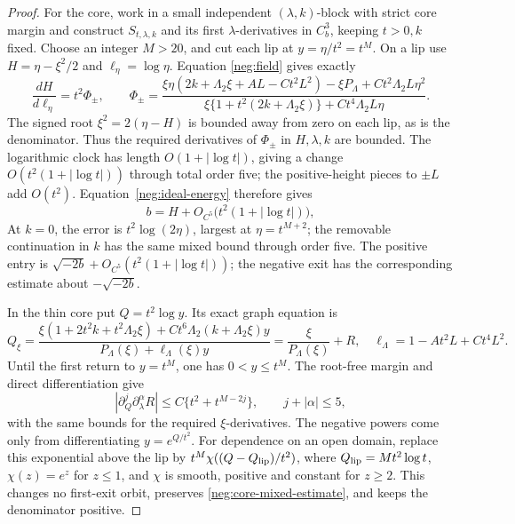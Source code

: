 \begin{proof}
For the core, work in a small independent \((\lambda,k)\)-block with
strict core margin and construct \(S_{t,\lambda,k}\) and its first
\(\lambda\)-derivatives in \(C_b^3\), keeping \(t>0,k\) fixed.
Choose an integer \(M>20\), and cut each lip at
\(y=\eta/t^2=t^M\). On a lip use
\(H=\eta-\xi^2/2\) and \(\ell_\eta=\log\eta\).
Equation \eqref{neg:field} gives exactly
\begin{equation}\label{neg:lip-equation}
 \frac{dH}{d\ell_\eta}=t^2\Phi_\pm,
 \qquad
 \Phi_\pm=
 \frac{\xi\eta(2k+\Lambda_2\xi+AL-Ct^2L^2)
              -\xi P_\Lambda+Ct^2\Lambda_2L\eta^2}
      {\xi\{1+t^2(2k+\Lambda_2\xi)\}
                              +Ct^4\Lambda_2L\eta} .
\end{equation}
The signed root \(\xi^2=2(\eta-H)\) is bounded away from zero
on each lip, as is the denominator. Thus the required derivatives
of \(\Phi_\pm\) in \(H,\lambda,k\) are bounded. The logarithmic
clock has length \(O(1+|\log t|)\), giving a change
\(O(t^2(1+|\log t|))\) through total order five; the positive-height
pieces to \(\pm L\) add \(O(t^2)\). Equation~\eqref{neg:ideal-energy}
therefore gives
\begin{equation}\label{neg:lip-label-error}
 b=H+O_{C^5}\bigl(t^2(1+|\log t|)\bigr),
\end{equation}
At \(k=0\), the error is \(t^2\log(2\eta)\), largest at
\(\eta=t^{M+2}\); the removable continuation in \(k\) has the same
mixed bound through order five. The positive entry is
\(\sqrt{-2b}+O_{C^5}(t^2(1+|\log t|))\); the negative exit has
the corresponding estimate about \(-\sqrt{-2b}\).

In the thin core put \(Q=t^2\log y\). Its exact graph equation is
\begin{equation}\label{neg:thin-core}
 Q_\xi=
 \frac{\xi(1+2t^2k+t^2\Lambda_2\xi)
               +Ct^6\Lambda_2(k+\Lambda_2\xi)y}
      {P_\Lambda(\xi)+\ell_\Lambda(\xi)y}
 =\frac{\xi}{P_\Lambda(\xi)}+R,
 \quad
 \ell_\Lambda=1-At^2L+Ct^4L^2 .
\end{equation}
Until the first return to \(y=t^M\), one has \(0<y\le t^M\).
The root-free margin and direct differentiation give
\begin{equation}\label{neg:core-mixed-estimate}
 |\partial_Q^j\partial_\lambda^\alpha R|
       \le C\{t^2+t^{M-2j}\},\qquad j+|\alpha|\le5,
\end{equation}
with the same bounds for the required \(\xi\)-derivatives.
The negative powers come only from differentiating
\(y=e^{Q/t^2}\). For dependence on an open domain, replace this
exponential above the lip by
\(t^M\chi((Q-Q_{\rm lip})/t^2)\), where
\(Q_{\rm lip}=Mt^2\log t\), \(\chi(z)=e^z\) for
\(z\le1\), and \(\chi\) is smooth, positive and constant for
\(z\ge2\). This changes no first-exit orbit, preserves
\eqref{neg:core-mixed-estimate}, and keeps the denominator positive.


\end{proof}
